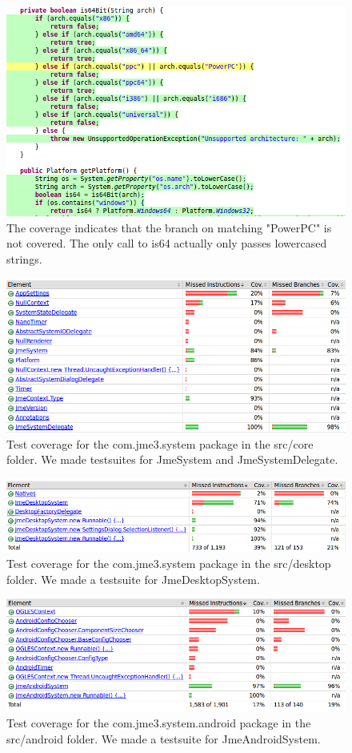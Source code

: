 \documentclass[a4paper, 10pt]{article}
\begin{document}
\begin{figure}
\includegraphics[width=\textwidth]{figures/bug-in-delegate.png}
\caption{The coverage indicates that the branch on matching "PowerPC" is not covered. The only call to is64 actually only passes lowercased strings.}
\label{fig:bug}
\end{figure}

\begin{figure}
\includegraphics[width=\textwidth]{figures/test-coverage-core.png}
\caption{Test coverage for the com.jme3.system package in the src/core folder. We made testsuites for JmeSystem and JmeSystemDelegate.}
\label{fig:cov-core}
\end{figure}

\begin{figure}
\includegraphics[width=\textwidth]{figures/test-coverage-desktop.png}
\caption{Test coverage for the com.jme3.system package in the src/desktop folder. We made a testsuite for JmeDesktopSystem.}
\label{fig:cov-desktop}
\end{figure}

\begin{figure}
\includegraphics[width=\textwidth]{figures/test-coverage-android.png}
\caption{Test coverage for the com.jme3.system.android package in the src/android folder. We made a testsuite for JmeAndroidSystem.}
\label{fig:cov-android}
\end{figure}
\end{document}
